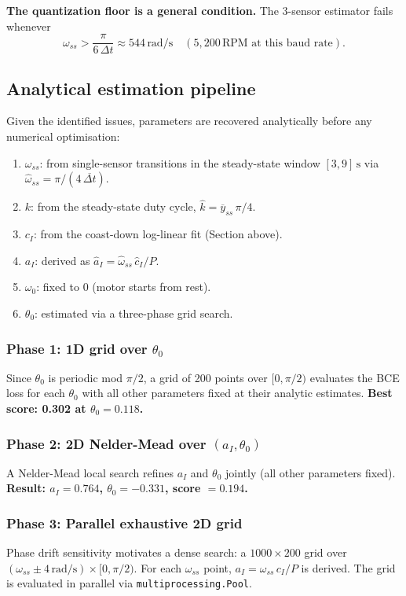 \documentclass[11pt,a4paper]{article}
\begin{document}
\textbf{The quantization floor is a general condition.}  The 3-sensor
estimator fails whenever
\[
  \omega_{ss} > \frac{\pi}{6\,\Delta t} \approx 544\,\text{rad/s}
  \quad (5{,}200\,\text{RPM at this baud rate}).
\]

\subsection{Analytical estimation pipeline}

Given the identified issues, parameters are recovered analytically before
any numerical optimisation:

\begin{enumerate}
  \item \textbf{$\omega_{ss}$}: from single-sensor transitions in the
        steady-state window $[3, 9]\,\text{s}$ via
        $\hat\omega_{ss} = \pi / (4\,\overline{\Delta t})$.
  \item \textbf{$k$}: from the steady-state duty cycle,
        $\hat{k} = \overline{y}_{ss}\,\pi/4$.
  \item \textbf{$c_I$}: from the coast-down log-linear fit (Section above).
  \item \textbf{$a_I$}: derived as $\hat{a}_I = \hat\omega_{ss}\,\hat{c}_I / P$.
  \item \textbf{$\omega_0$}: fixed to $0$ (motor starts from rest).
  \item \textbf{$\theta_0$}: estimated via a three-phase grid search.
\end{enumerate}

\subsubsection*{Phase 1: 1D grid over $\theta_0$}
Since $\theta_0$ is periodic mod $\pi/2$, a grid of 200 points over
$[0,\pi/2)$ evaluates the BCE loss for each $\theta_0$ with all other
parameters fixed at their analytic estimates.
\textbf{Best score: 0.302 at $\theta_0 = 0.118$.}

\subsubsection*{Phase 2: 2D Nelder-Mead over $(a_I, \theta_0)$}
A Nelder-Mead local search refines $a_I$ and $\theta_0$ jointly (all
other parameters fixed).
\textbf{Result: $a_I=0.764$, $\theta_0=-0.331$, score $=0.194$.}

\subsubsection*{Phase 3: Parallel exhaustive 2D grid}
Phase drift sensitivity motivates a dense search: a $1000 \times 200$
grid over $(\omega_{ss} \pm 4\,\text{rad/s}) \times [0, \pi/2)$.
For each $\omega_{ss}$ point, $a_I = \omega_{ss}\,c_I/P$ is derived.
The grid is evaluated in parallel via \texttt{multiprocessing.Pool}.
\end{document}
